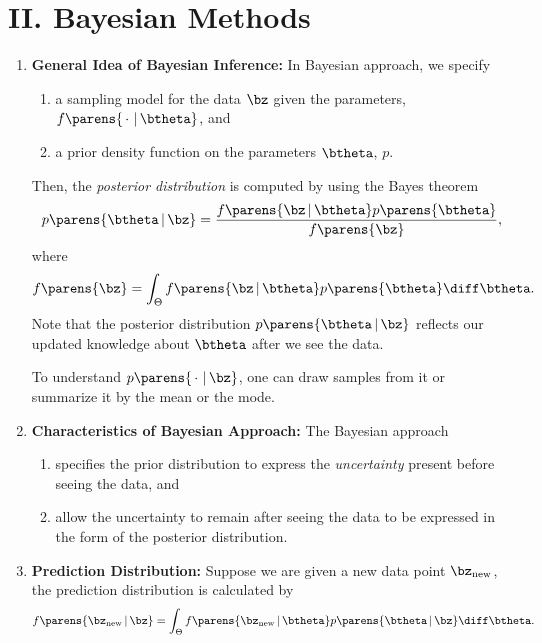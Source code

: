 \documentclass[12pt]{article}
\begin{document}
\section*{II. Bayesian Methods}

\begin{enumerate}[label=\textbf{\arabic*.}]
	
	\item \textbf{General Idea of Bayesian Inference:} In Bayesian approach, we specify 
	\begin{enumerate}
		\item a sampling model for the data $\bz$ given the parameters, $f  \parens{\,\cdot\, \,\vert\, \btheta}$, and 
		\item a prior density function on the parameters $\btheta$, $p$. 
	\end{enumerate}
	Then, the \textit{posterior distribution} is computed by using the Bayes theorem 
	\begin{equation}
		p \parens{\btheta \,\vert\, \bz} = \frac{f \parens{\bz \,\vert\, \btheta} p \parens{\btheta}}{f \parens{\bz}}, %
	\end{equation}
	where 
	\begin{align*}
		f \parens{\bz} = \int_{\Theta} f \parens{\bz \,\vert\, \btheta} p \parens{\btheta} \diff \btheta. 
	\end{align*}
	Note that the posterior distribution $p \parens{\btheta \,\vert\, \bz}$ reflects our updated knowledge about $\btheta$ after we see the data. 
	
	To understand $p \parens{\,\cdot\, \,\vert\, \bz}$, one can draw samples from it or summarize it by the mean or the mode. 
	
	\item \textbf{Characteristics of Bayesian Approach:} The Bayesian approach 
	\begin{enumerate}
		\item specifies the prior distribution to express the \emph{uncertainty} present before seeing the data, and 
		\item allow the uncertainty to remain after seeing the data to be expressed in the form of the posterior distribution. 
	\end{enumerate}
	
	\item \textbf{Prediction Distribution:} Suppose we are given a new data point $\bz_{\text{new}}$, the prediction distribution is calculated by 
	\begin{align}
		f \parens{\bz_{\text{new}} \,\vert\, \bz} = \int_{\Theta} f \parens{\bz_{\text{new}} \,\vert\, \btheta} p \parens{\btheta \,\vert\, \bz} \diff \btheta. 
	\end{align}
	

\end{enumerate}
\end{document}

